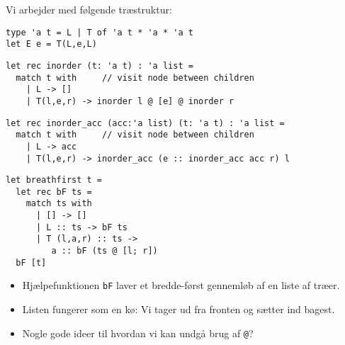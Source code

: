 \documentclass[rgb]{beamer}
\begin{document}
\begin{frame}[fragile]
\begin{footnotesize}

  \sp

  Vi arbejder med følgende træstruktur:
  \sp
\begin{lstlisting}[numbers=none,frame=none,mathescape]
type 'a t = L | T of 'a t * 'a * 'a t
let E e = T(L,e,L)
\end{lstlisting}

\begin{lstlisting}[numbers=none,frame=none,mathescape]
let rec inorder (t: 'a t) : 'a list =
  match t with     // visit node between children
    | L -> []
    | T(l,e,r) -> inorder l @ [e] @ inorder r
\end{lstlisting}


\begin{lstlisting}[numbers=none,frame=none,mathescape]
let rec inorder_acc (acc:'a list) (t: 'a t) : 'a list =
  match t with     // visit node between children
    | L -> acc
    | T(l,e,r) -> inorder_acc (e :: inorder_acc acc r) l
\end{lstlisting}

\end{footnotesize}
\end{frame}

\begin{frame}[fragile]
\begin{footnotesize}


  \begin{minipage}{0.55\textwidth}
\begin{lstlisting}[numbers=none,frame=none,mathescape]
let breathfirst t =
  let rec bF ts =
    match ts with
      | [] -> []
      | L :: ts -> bF ts
      | T (l,a,r) :: ts ->
         a :: bF (ts @ [l; r])
  bF [t]
\end{lstlisting}
  \end{minipage}
  \begin{minipage}{0.4\textwidth}
    \end{minipage}

\begin{itemize}
\item Hjælpefunktionen \lstinline{bF} laver et bredde-først gennemløb af en liste af træer.
\item Listen fungerer som en kø: Vi tager ud fra fronten og sætter ind bagest.
\end{itemize}

\begin{itemize}
\item Nogle gode ideer til hvordan vi kan undgå brug af \texttt{@}?
\end{itemize}

\end{footnotesize}
\end{frame}
\end{document}

